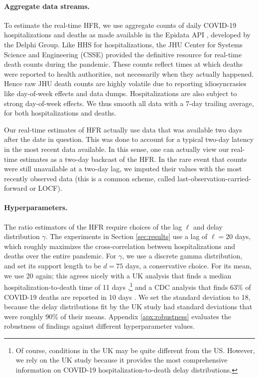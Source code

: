 \documentclass{article}
\begin{document}
\paragraph{Aggregate data streams.}

To estimate the real-time HFR, we use aggregate counts of daily COVID-19 
hospitalizations and deaths as made available in the Epidata API
\citep{Epidata}, developed by the Delphi Group. Like HHS for hospitalizations,
the JHU Center for Systems Science and Engineering (CSSE) provided the
definitive resource for real-time death counts during the pandemic. These counts
reflect times at which deaths were reported to health authorities, not
necessarily when they actually happened. Hence raw JHU death counts are highly
volatile due to reporting idiosyncrasies like day-of-week effects and data
dumps. Hospitalizations are also subject to strong day-of-week effects. We
thus smooth all data with a 7-day trailing average, for both hospitalizations
and deaths.   

Our real-time estimates of HFR actually use data that was available two days
after the date in question. This was done to account for a typical two-day
latency in the most recent data available. In this sense, one can actually view
our real-time estimates as a two-day backcast of the HFR. In the rare event that
counts were still unavailable at a two-day lag, we imputed their values with the
most recently observed data (this is a common scheme, called
last-observation-carried-forward or LOCF).        

\paragraph{Hyperparameters.}

The ratio estimators of the HFR require choices of the lag $\ell$ and delay
distribution $\gamma$. The experiments in Section \ref{sec:results} use a lag of
$\ell=20$ days, which roughly maximizes the cross-correlation between
hospitalizations and deaths over the entire pandemic. For $\gamma$, we use a
discrete gamma distribution, and set its support length to be $d=75$ days, a
conservative choice. For its mean, we use 20 again; this agrees nicely with a UK
analysis that finds a median hospitalization-to-death time of 11 days
\citep{UKdelay},\footnote{Of course, conditions in the UK may be quite different
  from the US. However, we rely on the UK study because it provides the most
  comprehensive information on COVID-19 hospitalization-to-death delay 
  distributions.}   
and a CDC analysis that finds 63\% of COVID-19 deaths are reported in 10 days   
\citep{cdc_deaths_demographic_geographic_2023}. We set the standard deviation to 
18, because the delay distributions fit by the UK study had standard deviations
that were roughly 90\% of their means. Appendix \ref{apx:robustness} evaluates
the robustness of findings against different hyperparameter values.  
\end{document}
